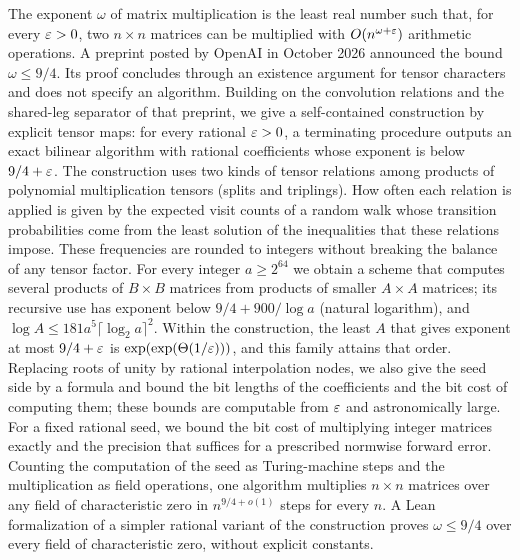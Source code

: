 The exponent \(\omega\) of matrix multiplication is the least real number
such that, for every \(\varepsilon>0\), two \(n\times n\) matrices can be
multiplied with \(O(n^{\omega+\varepsilon})\) arithmetic operations. A preprint
posted by OpenAI in October 2026 announced the bound \(\omega\le9/4\).
Its proof concludes through an existence argument for tensor characters
and does not specify an algorithm. Building on
the convolution relations and the shared-leg separator of that preprint,
we give a self-contained construction by explicit tensor maps: for every
rational \(\varepsilon>0\), a terminating procedure outputs an exact bilinear
algorithm with rational coefficients whose exponent is below
\(9/4+\varepsilon\). The construction uses two kinds of tensor relations among
products of polynomial multiplication tensors (splits and triplings).
How often each relation is applied is given by the expected visit counts
of a random walk whose transition probabilities come from the least
solution of the inequalities that these relations impose. These
frequencies are rounded to integers without breaking the balance of any
tensor factor. For every integer \(a\ge2^{64}\) we obtain a scheme that
computes several products of \(B\times B\) matrices from products of
smaller \(A\times A\) matrices; its recursive use has exponent below
\(9/4+900/\log a\) (natural logarithm), and
\(\log A\le181a^5\lceil\log_2a\rceil^2\). Within the construction, the
least \(A\) that gives exponent at most \(9/4+\varepsilon\) is
\(\exp(\exp(\Theta(1/\varepsilon)))\), and this family attains that order.
Replacing roots of unity by
rational interpolation nodes, we also give the seed side by a formula
and bound the bit lengths of the coefficients and the bit cost of
computing them; these bounds are computable from \(\varepsilon\) and
astronomically large. For a fixed
rational seed, we bound the bit cost of multiplying integer matrices
exactly and the precision that suffices for a prescribed normwise
forward error. Counting the computation of the seed as Turing-machine steps and the
multiplication as field operations, one algorithm multiplies
\(n\times n\) matrices over any field of characteristic zero in
\(n^{9/4+o(1)}\) steps for every \(n\). A Lean formalization of a
simpler rational variant of the construction proves \(\omega\le9/4\) over every
field of characteristic zero, without explicit constants.
